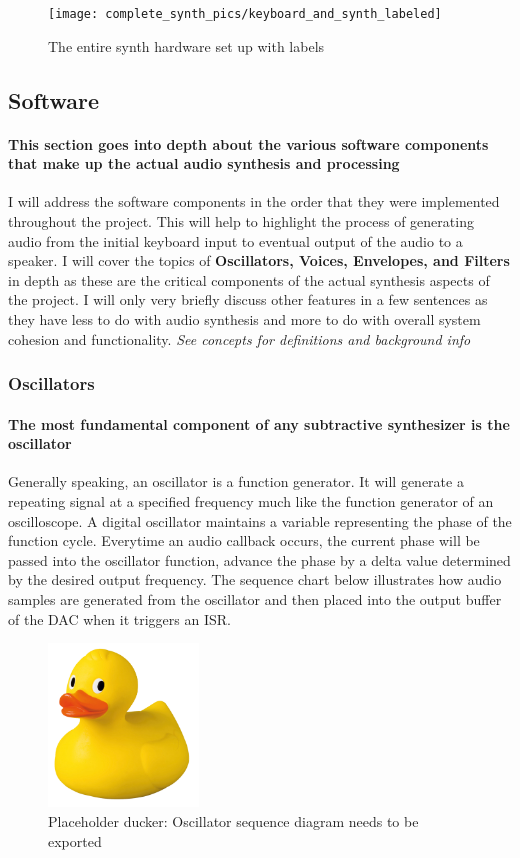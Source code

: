 \documentclass[acmlarge,screen]{acmart}
\begin{document}
	\begin{figure}[H]
		\texttt{[image: complete\_synth\_pics/keyboard\_and\_synth\_labeled]}
		\caption{The entire synth hardware set up with labels}
		\centering
	\end{figure}

\subsection{Software}
	\paragraph{This section goes into depth about the various software components that make up the actual audio synthesis and processing} I will address the software components in the order that they were implemented throughout the project. This will help to highlight the process of generating audio from the initial keyboard input to eventual output of the audio to a speaker. I will cover the topics of \textbf{Oscillators, Voices, Envelopes, and Filters} in depth as these are the critical components of the actual synthesis aspects of the project. I will only very briefly discuss other features in a few sentences as they have less to do with audio synthesis and more to do with overall system cohesion and functionality. \textit{See concepts for definitions and background info}

	\subsubsection{Oscillators}
	\paragraph{The most fundamental component of any subtractive synthesizer is the oscillator} Generally speaking, an oscillator is a function generator. It will generate a repeating signal at a specified frequency much like the function generator of an oscilloscope. A digital oscillator maintains a variable representing the phase of the function cycle. Everytime an audio callback occurs, the current phase will be passed into the oscillator function, advance the phase by a delta value determined by the desired output frequency. The sequence chart below illustrates how audio samples are generated from the oscillator and then placed into the output buffer of the DAC when it triggers an ISR.
	
	\begin{figure}[H]
		\includegraphics[width=4cm]{placeholder_duck}
		\caption{Placeholder ducker: Oscillator sequence diagram needs to be exported}
		\centering
	\end{figure}
\end{document}
